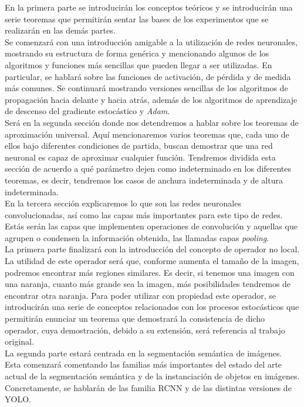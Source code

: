 En la primera parte se introducirán los conceptos teóricos y se introducirán una serie teoremas que permitirán sentar las bases de los experimentos que se realizarán en las demás partes.\\

Se comenzará con una introducción amigable a la utilización de redes neuronales, mostrando su estructura de forma genérica y mencionando algunos de los algoritmos y funciones más sencillas que pueden llegar a ser utilizadas. En particular, se hablará sobre las funciones de activación, de pérdida y de medida más comunes. Se continuará mostrando versiones sencillas de los algoritmos de propagación hacia delante y hacia atrás, además de los algoritmos de aprendizaje de descenso del gradiente estocástico y \emph{Adam}.\\

Será en la segunda sección donde nos detendremos a hablar sobre los teoremas de aproximación universal. Aquí mencionaremos varios teoremas que, cada uno de ellos bajo diferentes condiciones de partida, buscan demostrar que una red neuronal es capaz de aproximar cualquier función. Tendremos dividida esta sección de acuerdo a qué parámetro dejen como indeterminado en los diferentes teoremas, es decir, tendremos los casos de anchura indeterminada y de altura indeterminada.\\

En la tercera sección explicaremos lo que son las redes neuronales convolucionadas, así como las capas más importantes para este tipo de redes. Estás serán las capas que implementen operaciones de convolución y aquellas que agrupen o condensen la información obtenida, las llamadas capas \emph{pooling}.\\

La primera parte finalizará con la introducción del concepto de operador no local. La utilidad de este operador será que, conforme aumenta el tamaño de la imagen, podremos encontrar más regiones similares. Es decir, si tenemos una imagen con una naranja, cuanto más grande sea la imagen, más posibilidades tendremos de encontrar otra naranja. Para poder utilizar con propiedad este operador, se introducirán una serie de conceptos relacionados con los procesos estocásticos que permitirán enunciar un teorema que demostrará la consistencia de dicho operador, cuya demostración, debido a su extensión, será referencia al trabajo original.\\

La segunda parte estará centrada en la segmentación semántica de imágenes. Esta comenzará comentando las familias más importantes del estado del arte actual de la segmentación semántica y de la instanciación de objetos en imágenes. Concretamente, se hablarán de las familia RCNN y de las distintas versiones de YOLO.\\

